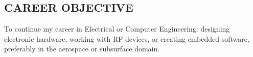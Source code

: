\documentclass[line,mmmargin]{res}
\begin{document}
\setlength\columnsep{-30pt}
\address{51 Irene St.}
\address{Chicopee MA 01013}
\website{}
 
\begin{resume}
 \setlength\multicolsep{2pt}

\section{CAREER OBJECTIVE}   
	To continue my career in Electrical or Computer Engineering: 
	designing electronic hardware, working with RF devices, or creating 
	embedded software, preferably in the aerospace or subsurface domain.
 

\end{resume}
\end{document}
